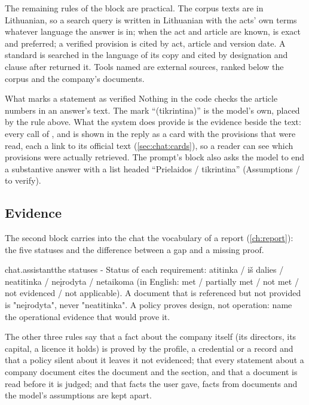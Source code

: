 The remaining rules of the block are practical. The corpus texts are in Lithuanian, so a search
query is written in Lithuanian with the acts' own terms whatever language the answer is in;
when the act and article are known,  is exact and preferred; a verified
provision is cited by act, article and version date. A standard is searched in the language of
its copy and cited by designation and clause after  returned it. Tools
named  are external sources, ranked below the corpus and the company's documents.

\begin{aibox}{What marks a statement as verified}
Nothing in the code checks the article numbers in an answer's text. The mark
\enquote{(tikrintina)} is the model's own, placed by the rule above. What the system does
provide is the evidence beside the text: every call of ,
 and  is shown in the reply as a card with the
provisions that were read, each a link to its official text (\cref{sec:chat:cards}), so a
reader can see which provisions were actually retrieved. The prompt's  block also
asks the model to end a substantive answer with a list headed \enquote{Prielaidos /
tikrintina} (Assumptions / to verify).
\end{aibox}

\subsection{Evidence}

The second block carries into the chat the vocabulary of a report (\cref{ch:report}): the five
statuses and the difference between a gap and a missing proof.

\begin{promptexcerpt}{chat.assistant}{the statuses}
- Status of each requirement: atitinka / iš dalies / neatitinka / neįrodyta / netaikoma (in English: met / partially met / not met / not evidenced / not applicable). A document that is referenced but not provided is "neįrodyta", never "neatitinka". A policy proves design, not operation: name the operational evidence that would prove it.
\end{promptexcerpt}

The other three rules say that a fact about the company itself (its directors, its capital, a
licence it holds) is proved by the profile, a credential or a record and that a policy silent
about it leaves it not evidenced; that every statement about a company document cites the
document and the section, and that a document is read before it is judged; and that facts the
user gave, facts from documents and the model's assumptions are kept apart.

